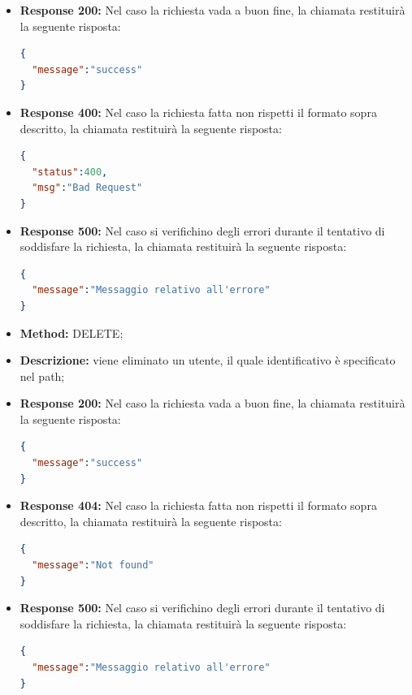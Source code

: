 \begin{itemize}
\begin{itemize}
\item \textbf{Response 200:} Nel caso la richiesta vada a buon fine, la chiamata restituirà la seguente risposta:
\begin{lstlisting}[language=json,firstnumber=1]
{
  "message":"success"
}
\end{lstlisting}
\item \textbf{Response 400:} Nel caso la richiesta fatta non rispetti il formato sopra descritto, la chiamata restituirà la seguente risposta:
\begin{lstlisting}[language=json,firstnumber=1]
{
  "status":400,
  "msg":"Bad Request"
}
\end{lstlisting}
\item \textbf{Response 500:} Nel caso si verifichino degli errori durante il tentativo di soddisfare la richiesta, la chiamata restituirà la seguente risposta:
\begin{lstlisting}[language=json,firstnumber=1]
{
  "message":"Messaggio relativo all'errore"
}
\end{lstlisting}
\end{itemize}

\begin{itemize}
\item \textbf{Method:} DELETE;
\item \textbf{Descrizione:} viene eliminato un utente, il quale identificativo è specificato nel path;
\item \textbf{Response 200:} Nel caso la richiesta vada a buon fine, la chiamata restituirà la seguente risposta:
\begin{lstlisting}[language=json,firstnumber=1]
{
  "message":"success"
}
\end{lstlisting}
\item \textbf{Response 404:} Nel caso la richiesta fatta non rispetti il formato sopra descritto, la chiamata restituirà la seguente risposta:
\begin{lstlisting}[language=json,firstnumber=1]
{
  "message":"Not found"
}
\end{lstlisting}
\item \textbf{Response 500:} Nel caso si verifichino degli errori durante il tentativo di soddisfare la richiesta, la chiamata restituirà la seguente risposta:
\begin{lstlisting}[language=json,firstnumber=1]
{
  "message":"Messaggio relativo all'errore"
}
\end{lstlisting}
\end{itemize}


\end{itemize}
